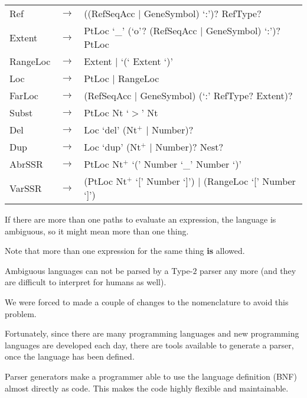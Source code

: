 \documentclass[a4, portrait]{seminar}
\providecommand{\mspace}{\vspace{0.5cm}}
\begin{document}
\begin{slide}

\begin{tabular}{lll}
Ref & $\rightarrow$ & ((RefSeqAcc $|$ GeneSymbol) `:')? RefType?\\
Extent & $\rightarrow$ & PtLoc `\_' (`o'? (RefSeqAcc $|$ GeneSymbol) `:')? PtLoc\\
RangeLoc & $\rightarrow$ & Extent $|$ `(` Extent `)'\\
Loc & $\rightarrow$ & PtLoc $|$ RangeLoc\\
FarLoc & $\rightarrow$ & (RefSeqAcc $|$ GeneSymbol) (`:' RefType? Extent)? \\
Subst & $\rightarrow$ & PtLoc Nt `$>$' Nt\\
Del & $\rightarrow$ & Loc `del' (Nt$^+$ $|$ Number)?\\
Dup & $\rightarrow$ & Loc `dup' (Nt$^+$ $|$ Number)? Nest?\\
AbrSSR & $\rightarrow$ & PtLoc  Nt$^+$ `(' Number `\_' Number `)'\\
VarSSR & $\rightarrow$ & (PtLoc  Nt$^+$ `[' Number `]') $|$ (RangeLoc `[' Number `]') \\
\end{tabular}
\vfill
\end{slide}

\begin{slide}

If there are more than one paths to evaluate an expression, the language is 
ambiguous, so it might mean more than one thing.

Note that more than one expression for the same thing {\bf is} allowed.
\mspace

Ambiguous languages can not be parsed by a Type-$2$ parser any more (and they
are difficult to interpret for humans as well).
\mspace

We were forced to made a couple of changes to the nomenclature to avoid this
problem. 
\vfill
\end{slide}

\begin{slide}

Fortunately, since there are many programming languages and new programming
languages are developed each day, there are tools available to generate a 
parser, once the language has been defined.
\mspace

Parser generators make a programmer able to use the language definition
(BNF) almost directly as code. This makes the code highly flexible and 
maintainable.
\vfill
\end{slide}
\end{document}
